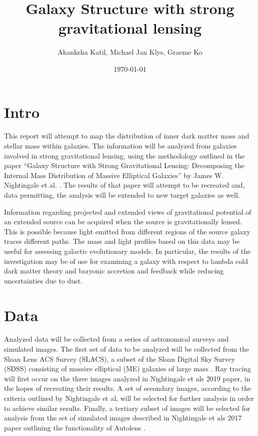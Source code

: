 \documentclass{article}
\title{Galaxy Structure with strong gravitational lensing}
\author{Akanksha Katil, Michael Jan Klys, Graeme Ko}
\date{\today}
\begin{document}
\maketitle

\section{Intro}

This report will attempt to map the distribution of inner dark matter mass and stellar mass within galaxies. The information will be analyzed from galaxies involved in strong gravitational lensing, using the methodology outlined in the paper “Galaxy Structure with Strong Gravitational Lensing: Decomposing the Internal Mass Distribution of Massive Elliptical Galaxies” by James W. Nightingale et al. \cite{Nightingale_2019}. The results of that paper will attempt to be recreated and, data permitting, the analysis will be extended to new target galaxies as well. 

Information regarding projected and extended views of gravitational potential of an extended source can be acquired when the source is gravitationally lensed. This is possible because light emitted from different regions of the source galaxy traces different paths. The mass and light profiles based on this data may be useful for assessing galactic evolutionary models. In particular, the results of the investigation may be of use for examining a galaxy with respect to lambda cold dark matter theory and baryonic accretion and feedback while reducing uncertainties due to dust. \cite{Nightingale_2019} 



\section{Data}

Analyzed data will be collected from a series of astronomical surveys and simulated images. The first set of data to be analyzed will be collected from the Sloan Lens ACS Survey (SLACS), a subset of the Sloan Digital Sky Survey (SDSS) consisting of massive elliptical (ME) galaxies of large mass \cite{Nightingale_2019}. Ray tracing will first occur on the three images analyzed in Nightingale et als 2019 paper, in the hopes of recreating their results. A set of secondary images, according to the criteria outlined by Nightingale et al, will be selected for further analysis in order to achieve similar results. Finally, a tertiary subset of images will be selected for analysis from the set of simulated images described in Nightingale et als 2017 paper outlining the functionality of Autolens \cite{Nightingale_2017}.
\end{document}
